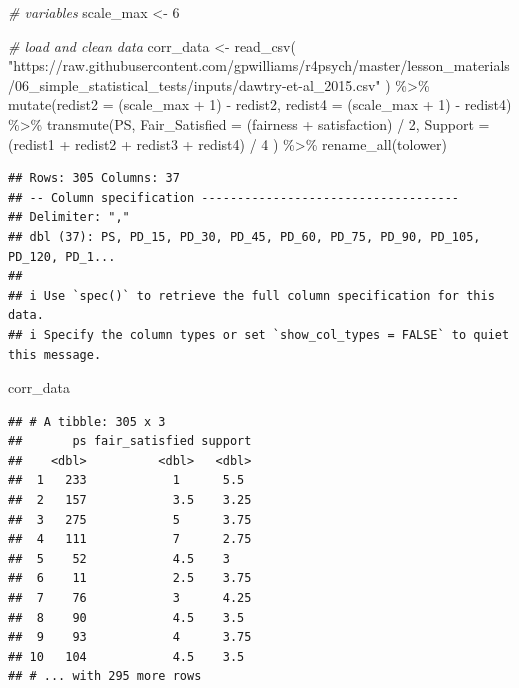 \documentclass[
]{book}
\newenvironment{Shaded}{\begin{snugshade}}{\end{snugshade}}
\newcommand{\AttributeTok}[1]{\textcolor[rgb]{0.77,0.63,0.00}{#1}}
\newcommand{\CommentTok}[1]{\textcolor[rgb]{0.56,0.35,0.01}{\textit{#1}}}
\newcommand{\DecValTok}[1]{\textcolor[rgb]{0.00,0.00,0.81}{#1}}
\newcommand{\FunctionTok}[1]{\textcolor[rgb]{0.00,0.00,0.00}{#1}}
\newcommand{\NormalTok}[1]{#1}
\newcommand{\OtherTok}[1]{\textcolor[rgb]{0.56,0.35,0.01}{#1}}
\newcommand{\SpecialCharTok}[1]{\textcolor[rgb]{0.00,0.00,0.00}{#1}}
\newcommand{\StringTok}[1]{\textcolor[rgb]{0.31,0.60,0.02}{#1}}
\begin{document}
\begin{Shaded}
\begin{Highlighting}[]
\CommentTok{\# variables}
\NormalTok{scale\_max }\OtherTok{\textless{}{-}} \DecValTok{6}

\CommentTok{\# load and clean data}
\NormalTok{corr\_data }\OtherTok{\textless{}{-}} \FunctionTok{read\_csv}\NormalTok{(}
  \StringTok{"https://raw.githubusercontent.com/gpwilliams/r4psych/master/lesson\_materials/06\_simple\_statistical\_tests/inputs/dawtry{-}et{-}al\_2015.csv"}
\NormalTok{  ) }\SpecialCharTok{\%\textgreater{}\%}
  \FunctionTok{mutate}\NormalTok{(}\AttributeTok{redist2 =}\NormalTok{ (scale\_max }\SpecialCharTok{+} \DecValTok{1}\NormalTok{) }\SpecialCharTok{{-}}\NormalTok{ redist2,}
         \AttributeTok{redist4 =}\NormalTok{ (scale\_max }\SpecialCharTok{+} \DecValTok{1}\NormalTok{) }\SpecialCharTok{{-}}\NormalTok{ redist4) }\SpecialCharTok{\%\textgreater{}\%}
  \FunctionTok{transmute}\NormalTok{(PS, }
            \AttributeTok{Fair\_Satisfied =}\NormalTok{ (fairness }\SpecialCharTok{+}\NormalTok{ satisfaction) }\SpecialCharTok{/} \DecValTok{2}\NormalTok{,}
            \AttributeTok{Support =}\NormalTok{ (redist1 }\SpecialCharTok{+}\NormalTok{ redist2 }\SpecialCharTok{+}\NormalTok{ redist3 }\SpecialCharTok{+}\NormalTok{ redist4) }\SpecialCharTok{/} \DecValTok{4}
\NormalTok{            ) }\SpecialCharTok{\%\textgreater{}\%}
  \FunctionTok{rename\_all}\NormalTok{(tolower)}
\end{Highlighting}
\end{Shaded}

\begin{verbatim}
## Rows: 305 Columns: 37
## -- Column specification ------------------------------------
## Delimiter: ","
## dbl (37): PS, PD_15, PD_30, PD_45, PD_60, PD_75, PD_90, PD_105, PD_120, PD_1...
## 
## i Use `spec()` to retrieve the full column specification for this data.
## i Specify the column types or set `show_col_types = FALSE` to quiet this message.
\end{verbatim}

\begin{Shaded}
\begin{Highlighting}[]
\NormalTok{corr\_data}
\end{Highlighting}
\end{Shaded}

\begin{verbatim}
## # A tibble: 305 x 3
##       ps fair_satisfied support
##    <dbl>          <dbl>   <dbl>
##  1   233            1      5.5 
##  2   157            3.5    3.25
##  3   275            5      3.75
##  4   111            7      2.75
##  5    52            4.5    3   
##  6    11            2.5    3.75
##  7    76            3      4.25
##  8    90            4.5    3.5 
##  9    93            4      3.75
## 10   104            4.5    3.5 
## # ... with 295 more rows
\end{verbatim}
\end{document}
